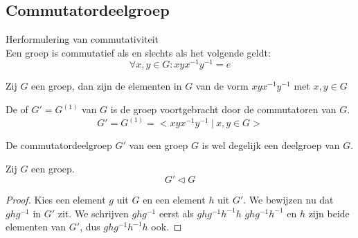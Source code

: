 \documentclass[main.tex]{subfiles}
\begin{document}
\subsection{Commutatordeelgroep}
\label{sec:commutatordeelgroep}

\begin{st}
  \label{st:herformulering-commutativiteit}
  Herformulering van commutativiteit\\
  Een groep is commutatief als en slechts als het volgende geldt:
  \[ \forall x,y \in G: xyx^{-1}y^{-1} = e \]
\end{st}

\begin{de}
  Zij $G$ een groep, dan zijn de elementen in $G$ van de vorm $xyx^{-1}y^{-1}$ met $x,y\in G$ 
\end{de}

\begin{de}
  De  of  $G' = G^{(1)}$ van $G$ is de groep voortgebracht door de commutatoren van $G$.
  \[ G' = G^{(1)} = < xyx^{-1}y^{-1} \ |\ x,y\in G > \]
\end{de}

\begin{st}
  \label{st:commutatordeelgroep-is-deelgroep}
  De commutatordeelgroep $G'$ van een groep $G$ is wel degelijk een deelgroep van $G$.
\end{st}

\begin{st}
  Zij $G$ een groep.
  \[ G' \triangleleft G \]

  \begin{proof}
    Kies een element $g$ uit $G$ en een element $h$ uit $G'$.
    We bewijzen nu dat $ghg^{-1}$ in $G'$ zit.
    We schrijven $ghg^{-1}$ eerst als $ghg^{-1}h^{-1}h$
    $ghg^{-1}h^{-1}$ en $h$ zijn beide elementen van $G'$, dus $ghg^{-1}h^{-1}h$ ook.
  \end{proof}
\end{st}
\end{document}
